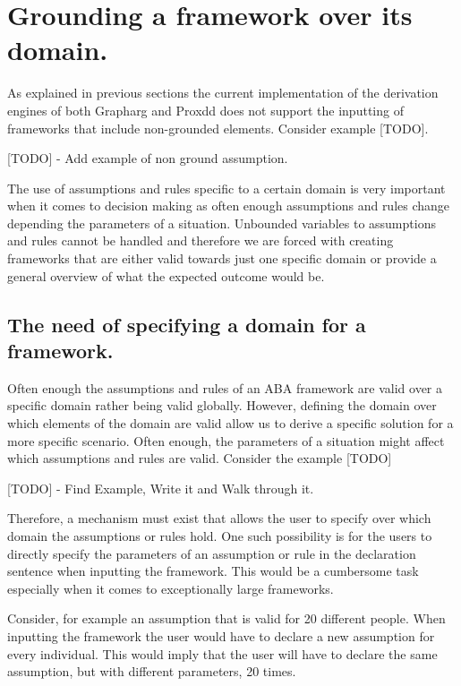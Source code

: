 \newpage

\chapter{Grounding a framework over its domain.}

As explained in previous sections the current implementation of the derivation engines of both Grapharg and Proxdd does not support the inputting of frameworks that include non-grounded elements. Consider example [TODO].

[TODO] - Add example of non ground assumption.

The use of assumptions and rules specific to a certain domain is very important when it comes to decision making as often enough assumptions and rules change depending the parameters of a situation. Unbounded variables to assumptions and rules cannot be handled and therefore we are forced with creating frameworks that are either valid towards just one specific domain or provide a general overview of what the expected outcome would be.

\section{The need of specifying a domain for a framework.}

Often enough the assumptions and rules of an ABA framework are valid over a specific domain rather being valid globally. However, defining the domain over which elements of the domain are valid allow us to derive a specific solution for a more specific scenario. Often enough, the parameters of a situation might  affect which assumptions and rules are valid. Consider the example [TODO]

[TODO] - Find Example, Write it and Walk through it.

Therefore, a mechanism must exist that allows the user to specify over which domain the assumptions or rules hold. One such possibility is for the users to directly specify the parameters of an assumption or rule in the declaration sentence when inputting the framework. This would be a cumbersome task especially when it comes to exceptionally large frameworks. 

Consider, for example an assumption that is valid for 20 different people. When inputting the framework the user would have to declare a new assumption for every individual. This would imply that the user will have to declare the same assumption, but with different parameters, 20 times.

